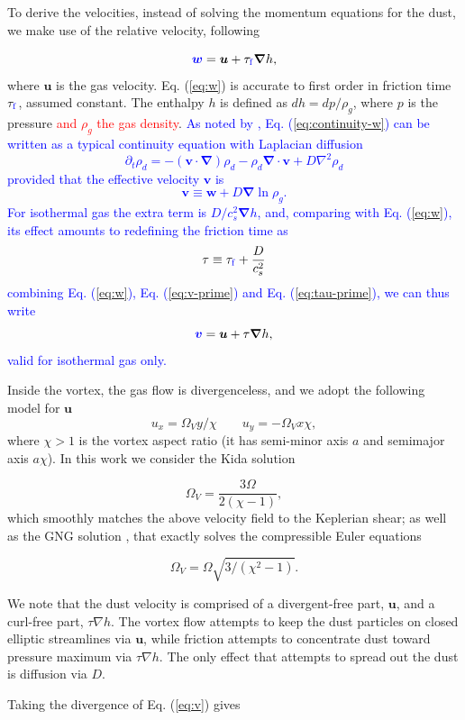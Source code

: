 \documentclass[apj]{emulateapj}
\renewcommand{\v}[1]{{\boldsymbol{#1}}} %
\def\blue#1{\textcolor{blue}{#1}}
\def\red#1{\textcolor{red}{#1}}
\newcommand{\del}{\v{\nabla}}
\newcommand{\grad}{\del}
\newcommand{\Div}{\del\cdot}
\newcommand{\Laplace}{\nabla^2}
\newcommand{\Eq}[1]{Eq. (\ref{#1})}
\newcommand{\eq}[1]{\Eq{#1}}
\newcommand{\beq}{\begin{equation}}
\newcommand{\eeq}{\end{equation}}
\newcommand{\tauf}{\tau_{\rm \blue{f}}}
\begin{document}
To derive the velocities, instead of solving the momentum equations
for the dust, we make use of the relative velocity, following
\citet[see also \citealt{Youdin08}]{Youdin-Goodman05}

\beq
\blue{\v{w}} = \v{u} + \tauf  \grad{h}, 
\label{eq:w}
\eeq
\noindent where $\v{u}$ is the gas velocity. \eq{eq:w} is 
accurate to first order in friction time $\tauf$, assumed 
constant. The enthalpy $h$ is defined as $dh = dp /\rho_g$, where $p$ 
is the pressure \red{ and $\rho_g$ the gas density}. \blue{As noted by
\cite{Charnoz11}, \eq{eq:continuity-w} can be written as a typical continuity equation with Laplacian diffusion 
\beq
\partial_t \rho_d = -(\v{v} \cdot\del)\rho_d - \rho_d \Div{\v{v}} + D\Laplace\rho_d \label{eq:continuity}
\eeq
\noindent provided that the effective velocity $\v{v}$ is 
\beq
\v{v} \equiv \v{w}  + D\grad\ln \rho_g\label{eq:v-prime}.
\eeq\noindent For isothermal gas the extra term is $D/c_s^2 \grad{h}$,
and, comparing with \eq{eq:w}, its effect amounts to redefining the
friction time as 
\beq
\tau \equiv \tauf + \frac{D}{c_s^2}\label{eq:tau-prime}
\eeq
\noindent combining \eq{eq:w}, \eq{eq:v-prime} and \eq{eq:tau-prime},
we can thus write
\beq
\blue{\v{v}} = \v{u} + \tau \grad{h}, \label{eq:v}
\eeq \noindent valid for isothermal gas only.}

Inside the vortex, the gas flow is divergenceless, and 
we adopt the following model for $\v{u}$
\beq
  u_x = \varOmega_V y / \chi \qquad  u_y= -\varOmega_V x \chi,
  \label{eq:vortex}
\eeq
\noindent where $\chi > 1$ is the vortex aspect ratio (it has
semi-minor axis $a$ and semimajor axis $a\chi$). In this work
we consider the Kida solution \citep{Kida81}

\beq
\varOmega_V = \frac{3\varOmega}{2(\chi-1)},  
\eeq
which smoothly matches the above velocity field to the Keplerian
shear; as well as the GNG solution \citep{Goodman87}, that exactly solves the 
compressible Euler equations 

\beq
\varOmega_V=\varOmega\sqrt{3/(\chi^2-1)}.
\eeq

We note that the dust
velocity is comprised of a divergent-free part, $\v{u}$, and a
curl-free part, $\tau\nabla{h}$. The vortex flow attempts to keep the
dust particles on closed elliptic streamlines via $\v{u}$, while friction
attempts to concentrate dust toward pressure maximum via $\tau\nabla
h$. The only effect that attempts to spread out the dust is diffusion
via $D$.  

Taking the divergence of
\eq{eq:v} gives 
\end{document}
